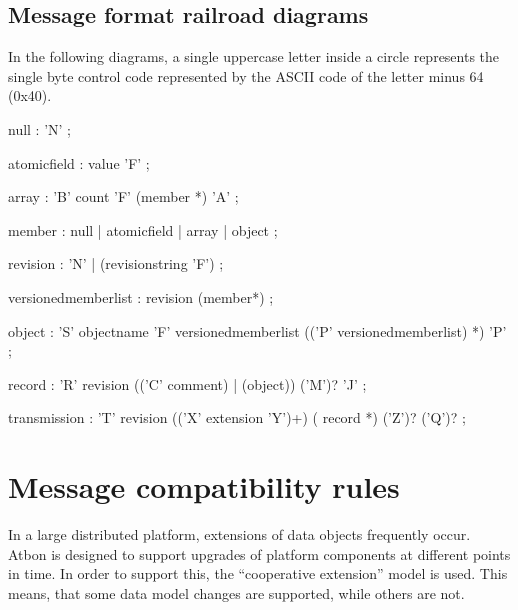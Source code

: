 \documentclass[11pt,a4paper,oneside]{article}
\begin{document}
\vspace{8mm}

\subsection{Message format railroad diagrams}
In the following diagrams, a single uppercase letter inside a circle represents the single byte control code represented by the ASCII code of the letter minus 64 (0x40).
 


\begin{rail}
null : 'N'
    ;
   
atomicfield : value 'F'
    ;
   
array :
    'B' count 'F' (member *) 'A'
    ;

member : null | atomicfield | array | object
    ;

revision : 'N' | (revisionstring 'F')
    ;
   
\end{rail}
        
\begin{rail}
versionedmemberlist :
    revision (member*)
    ;
\end{rail}
        
\begin{rail}
object :
    'S' objectname 'F' versionedmemberlist
          (('P' versionedmemberlist) *)
    'P'
    ;
\end{rail}
        
\begin{rail}
record :
    'R' revision
                          (('C' comment) | (object))
                                                    ('M')? 'J'
    ;
\end{rail}
        
\begin{rail}
transmission :
    'T' revision
    (('X' extension 'Y')+) 
    ( record *) 
    ('Z')?
    ('Q')?
    ;
\end{rail}

\vspace{8mm}


\section{Message compatibility rules}
In a large distributed platform, extensions of data objects frequently occur. Atbon is designed to support upgrades of platform
components at different points in time. In order to support this, the
``cooperative extension'' model is used. This means, that some data model changes are supported, while others are not.
\end{document}
